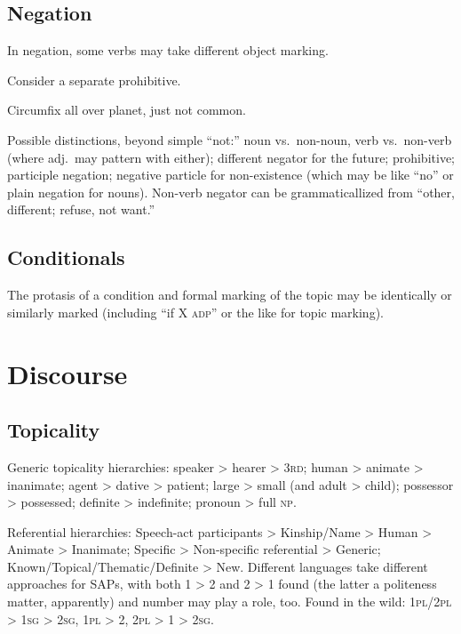 \documentclass[11pt]{article}
\newcommand{\I}[1]{\textsc{#1}}   %
\begin{document}


\subsection{Negation}
In negation, some verbs may take different object marking.

Consider a separate prohibitive.

Circumfix all over planet, just not common.

Possible distinctions, beyond simple ``not:'' noun vs.\ non-noun, verb
vs.\ non-verb (where adj.\ may pattern with either); different negator
for the future; prohibitive; participle negation; negative particle
for non-existence (which may be like ``no'' or plain negation for
nouns).  Non-verb negator can be grammaticallized from ``other,
different; refuse, not want.''


\subsection{Conditionals}
The protasis of a condition and formal marking of the topic may be
identically or similarly marked (including ``if X \I{adp}'' or the
like for topic marking).


\section{Discourse}

\subsection{Topicality}
Generic topicality hierarchies: speaker > hearer > \I{3rd}; human >
animate > inanimate; agent > dative > patient; large > small (and
adult > child); possessor > possessed; definite > indefinite; pronoun
> full \I{np}.

Referential hierarchies: Speech-act participants > Kinship/Name >
Human > Animate > Inanimate; Specific > Non-specific referential >
Generic; Known/Topical/Thematic/Definite > New.  Different languages
take different approaches for SAPs, with both 1 > 2 and 2 > 1 found
(the latter a politeness matter, apparently) and number may play a
role, too. Found in the wild: \I{1pl/2pl > 1sg > 2sg}, \I{1pl > 2},
\I{2pl > 1 > 2sg}.
\end{document}
